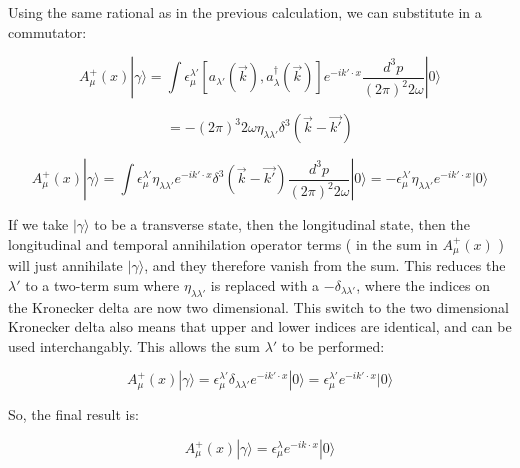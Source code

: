 \documentclass[a4]{article}
\begin{document}
\begin{framed}
        Using the same rational as in the previous calculation, we can substitute in a commutator:

        \begin{equation}
            A_{\mu}^{+} (x) | \gamma \rangle = \int \epsilon^{\lambda'}_{\mu} [a_{\lambda'} (\vec{k}), a_{\lambda}^{\dagger} (\vec{k})] e^{- i k' \cdot x} \frac{d^3 p}{(2 \pi)^2 2 \omega} | 0 \rangle
        \end{equation}

        \begin{equation}
            [a_{\lambda'} (\vec{k}), a_{\lambda}^{\dagger} (\vec{k})] = - (2 \pi)^{3} 2 \omega \eta_{\lambda \lambda'} \delta^{3} (\vec{k} - \vec{k'})
        \end{equation}

        \begin{equation}
            A_{\mu}^{+} (x) | \gamma \rangle = \int \epsilon^{\lambda'}_{\mu} \eta_{\lambda \lambda'} e^{- i k' \cdot x} \delta^{3} (\vec{k} - \vec{k'}) \frac{d^3 p}{(2 \pi)^2 2 \omega} | 0 \rangle = - \epsilon^{\lambda'}_{\mu} \eta_{\lambda \lambda'} e^{- i k' \cdot x} | 0 \rangle
        \end{equation}

        If we take $| \gamma \rangle$ to be a transverse state, then the longitudinal state, then the longitudinal and temporal annihilation operator terms \big( in the sum in $A_{\mu}^{+} (x)$ \big) will just annihilate
        $| \gamma \rangle$, and they therefore vanish from the sum. This reduces the $\lambda'$ to a two-term sum where $\eta_{\lambda \lambda'}$ is replaced with a $- \delta_{\lambda \lambda'}$, where the indices on the
        Kronecker delta are now two dimensional. This switch to the two dimensional Kronecker delta also means that upper and lower indices are identical, and can be used interchangably. This allows the sum $\lambda'$ to
        be performed:

        \begin{equation}
            A_{\mu}^{+} (x) | \gamma \rangle = \epsilon^{\lambda'}_{\mu} \delta_{\lambda \lambda'} e^{- i k' \cdot x} | 0 \rangle = \epsilon^{\lambda'}_{\mu} e^{- i k' \cdot x} | 0 \rangle
        \end{equation}

        So, the final result is:

        \begin{framed}
            \begin{equation}
                A_{\mu}^{+} (x) | \gamma \rangle = \epsilon^{\lambda}_{\mu} e^{- i k \cdot x} | 0 \rangle
            \end{equation}
        \end{framed}


\end{framed}
\end{document}

